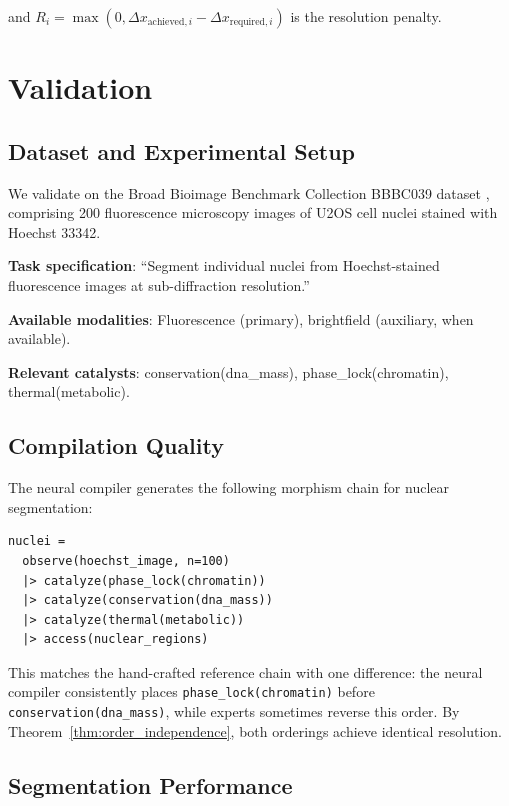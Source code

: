 \documentclass[11pt,a4paper]{article}
\theoremstyle{definition}
\theoremstyle{remark}
\begin{document}
and $R_i = \max(0, \Delta x_{\text{achieved},i} - \Delta x_{\text{required},i})$ is the resolution penalty.

\section{Validation}
\label{sec:validation}

\subsection{Dataset and Experimental Setup}

We validate on the Broad Bioimage Benchmark Collection BBBC039 dataset \cite{BBBC039}, comprising 200 fluorescence microscopy images of U2OS cell nuclei stained with Hoechst 33342.

\textbf{Task specification}: ``Segment individual nuclei from Hoechst-stained fluorescence images at sub-diffraction resolution.''

\textbf{Available modalities}: Fluorescence (primary), brightfield (auxiliary, when available).

\textbf{Relevant catalysts}: conservation(dna\_mass), phase\_lock(chromatin), thermal(metabolic).

\subsection{Compilation Quality}

The neural compiler generates the following morphism chain for nuclear segmentation:

\begin{lstlisting}[caption={Neurally compiled morphism chain for nuclear segmentation}]
nuclei =
  observe(hoechst_image, n=100)
  |> catalyze(phase_lock(chromatin))
  |> catalyze(conservation(dna_mass))
  |> catalyze(thermal(metabolic))
  |> access(nuclear_regions)
\end{lstlisting}

This matches the hand-crafted reference chain with one difference: the neural compiler consistently places \texttt{phase\_lock(chromatin)} before \texttt{conservation(dna\_mass)}, while experts sometimes reverse this order. By Theorem~\ref{thm:order_independence}, both orderings achieve identical resolution.

\subsection{Segmentation Performance}
\end{document}
